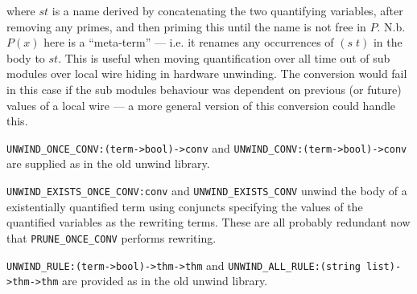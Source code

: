 where $st$ is a name derived by concatenating the two quantifying variables, after removing any primes, and
then priming this until the name is not free in $P$. N.b. $P(x)$ here is a ``meta-term'' --- i.e. it renames
any occurrences of $(s\; t)$ in the body to $st$.
This is useful when moving quantification over all time out of sub modules over local wire hiding in 
hardware unwinding. The conversion would fail in this case if the sub modules behaviour was dependent on previous
(or future) values of a local wire --- a more general version of this conversion could handle this.

\verb!UNWIND_ONCE_CONV:(term->bool)->conv! and {\tt UNWIND\_CONV:\-(term->bool)\-->conv}
are supplied as in the old unwind library.

\verb!UNWIND_EXISTS_ONCE_CONV:conv! and \verb!UNWIND_EXISTS_CONV! unwind the body of a existentially quantified
term using conjuncts specifying the values of the quantified variables as the rewriting terms. These are all
probably redundant now that \verb!PRUNE_ONCE_CONV! performs rewriting.

\verb!UNWIND_RULE:(term->bool)->thm->thm! and 
{\tt UNWIND\_ALL\_RULE:\-(string~list)\-->thm\-->thm} are provided as in the old unwind
library.



